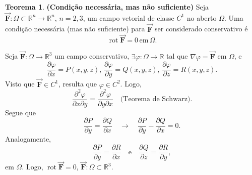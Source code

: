 \documentclass[11pt]{article}
\theoremstyle{definition}
\newtheorem{teorema}{Teorema}
\begin{document}
	\begin{teorema}\textbf{(Condição necessária, mas não suficiente)}
		Seja $\vec{\boldsymbol{F}}:\Omega \subset \mathbb{R}^n\to \mathbb{R}^n$, $n=2,3$, um campo vetorial de classe $C^1$ no aberto $\Omega$. Uma condição necessária (mas não suficiente) para $\vec{\boldsymbol{F}}$ ser considerado conservativo é
		\begin{equation*}
			\operatorname{rot}\vec{\boldsymbol{F}}=0\, \text{em}\, \Omega.
		\end{equation*} 
	\end{teorema}
	Seja $\vec{\boldsymbol{F}}:\Omega\to \mathbb{R}^3$ um campo conservativo, $\exists\varphi:\Omega\to \mathbb{R}$ tal que $\nabla\varphi=\vec{\boldsymbol{F}}$ em $\Omega$, e
	\begin{equation*}
		\frac{\partial \varphi}{\partial x}=P(x,y,z),\, \frac{\partial \varphi}{\partial y}=Q(x,y,z),\, \frac{\partial \varphi}{\partial z}=R(x,y,z).
	\end{equation*}
	Visto que $\vec{\boldsymbol{F}}\in C^1$, resulta que $\varphi\in C^2$. Logo,
	\begin{equation*}
		\frac{\partial^2 \varphi}{\partial x \partial y}=\frac{\partial^2 \varphi}{\partial y \partial x}\quad \text{(Teorema de Schwarz)}.
	\end{equation*}
	Segue que
	\begin{equation*}
		\frac{\partial P}{\partial y}=\frac{\partial Q}{\partial x}\quad \longrightarrow\quad \frac{\partial P}{\partial y}-\frac{\partial Q}{\partial x}=0.
	\end{equation*}
	Analogamente,
	\begin{equation*}
		\frac{\partial P}{\partial y}=\frac{\partial R}{\partial x}\quad \text{e}\quad \frac{\partial Q}{\partial z}=\frac{\partial R}{\partial y},
	\end{equation*}
	em $\Omega$. Logo, $\operatorname{rot}\vec{\boldsymbol{F}}=0$, $\vec{\boldsymbol{F}}:\Omega \subset \mathbb{R}^3$.
	
\end{document}
